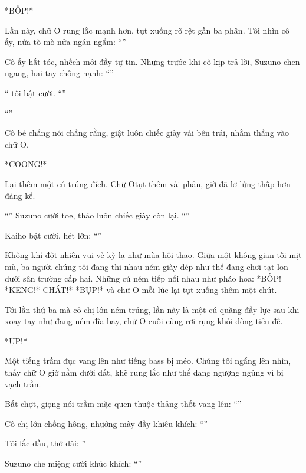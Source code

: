 \documentclass[../main.tex]{subfiles}
\begin{document}
*BỐP!*

Lần này, chữ O rung lắc mạnh hơn, tụt xuống rõ rệt gần ba phân. Tôi nhìn cô ấy, nửa tò mò nửa ngán ngẩm: ``''

Cô ấy hất tóc, nhếch môi đầy tự tin. Nhưng trước khi cô kịp trả lời, Suzuno chen ngang, hai tay chống nạnh: ``''

`` tôi bật cười. ``''

``''

Cô bé chẳng nói chẳng rằng, giật luôn chiếc giày vải bên trái, nhắm thẳng vào chữ O.

*COONG!*

Lại thêm một cú trúng đích. Chữ Otụt thêm vài phân, giờ đã lơ lửng thấp hơn đáng kể.

``'' Suzuno cười toe, tháo luôn chiếc giày còn lại. ``''

Kaiho bật cười, hét lớn: ``\textbf{}''

Không khí đột nhiên vui vẻ kỳ lạ như mùa hội thao. Giữa một không gian tối mịt mù, ba người chúng tôi đang thi nhau ném giày dép như thể đang chơi tạt lon dưới sân trường cấp hai. Những cú ném tiếp nối nhau như pháo hoa: *BỐP! *KENG!* CHÁT!* *BỤP!* và chữ O mỗi lúc lại tụt xuống thêm một chút.

Tới lần thứ ba mà cô chị lớn ném trúng, lần này là một cú quăng đầy lực sau khi xoay tay như đang ném đĩa bay, chữ O cuối cùng rơi rụng khỏi dòng tiêu đề.

*ỤP!*

Một tiếng trầm đục vang lên như tiếng bass bị méo. Chúng tôi ngẩng lên nhìn, thấy chữ O giờ nằm dưới đất, khẽ rung lắc như thể đang ngượng ngùng vì bị vạch trần.


Bất chợt, giọng nói trầm mặc quen thuộc thảng thốt vang lên: ``''

Cô chị lớn chống hông, nhướng mày đầy khiêu khích: ``''

Tôi lắc đầu, thở dài: ''

Suzuno che miệng cười khúc khích: ``''
\end{document}
